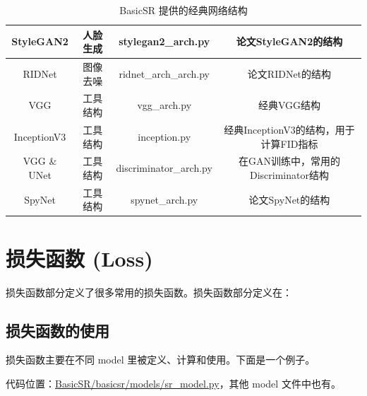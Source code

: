\documentclass[../main.tex]{subfiles}
\begin{document}
\begin{table}[h]
{\begin{tabular}{|c|c|c|c|}
            StyleGAN2         & 人脸生成      & stylegan2\_arch.py     & 论文StyleGAN2的结构                    \\ \hline
            RIDNet            & 图像去噪      & ridnet\_arch\_arch.py  & 论文RIDNet的结构                       \\ \hline
            VGG               & 工具结构      & vgg\_arch.py           & 经典VGG结构                            \\ \hline
            InceptionV3       & 工具结构      & inception.py           & 经典InceptionV3的结构，用于计算FID指标 \\ \hline
            VGG \& UNet       & 工具结构      & discriminator\_arch.py & 在GAN训练中，常用的Discriminator结构   \\ \hline
            SpyNet            & 工具结构      & spynet\_arch.py        & 论文SpyNet的结构                       \\ \hline
        \end{tabular}
    }
    \caption{BasicSR 提供的经典网络结构}
\end{table}




\section{损失函数 (Loss)}\label{code_structure:loss}

损失函数部分定义了很多常用的损失函数。损失函数部分定义在：
\subsection{损失函数的使用}

损失函数主要在不同 model 里被定义、计算和使用。下面是一个例子。

代码位置：\href{https://github.com/XPixelGroup/BasicSR/blob/master/basicsr/models/sr_model.py}{BasicSR/basicsr/models/sr\_model.py}，其他 model 文件中也有。
\end{document}
